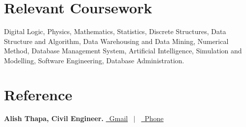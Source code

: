 \documentclass[a4paper,12pt]{article}
\begin{document}
\section{Relevant Coursework}
Digital Logic, Physics, Mathematics, Statistics, Discrete Structures, Data Structure and Algorithm, Data Warehousing and Data Mining, Numerical Method, Database Management System, Artificial Intelligence, Simulation and Modelling, Software Engineering,  Database Administration.

%	
\section{Reference}
\textbf{Alish Thapa, Civil Engineer.}  \hfill \href{mailto:alismgr101@gmail.com}{\raisebox{-0.05\height}\faEnvelope \ Gmail} \ $|$ \ 
\href{tel:+9779813545913}{\raisebox{-0.05\height}\faMobile \ Phone}

\vfill
{}
\end{document}
